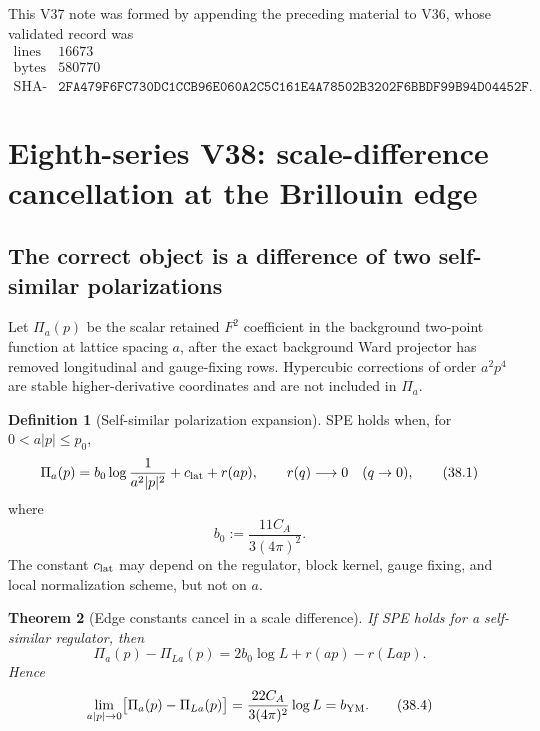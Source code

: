 \documentclass[11pt,oneside]{book}
\newtheorem{theorem}{Theorem}[chapter]
\theoremstyle{definition}
\newtheorem{definition}[theorem]{Definition}
\theoremstyle{remark}
\begin{document}
This V37 note was formed by appending the preceding material to V36,
whose validated record was
\[
\begin{array}{c|c}
\text{lines}&16673\\
\text{bytes}&580770\\
\text{SHA-256}&
\texttt{2FA479F6FC730DC1CCB96E060A2C5C161E4A78502B3202F6BBDF99B94D04452F}.
\end{array}
\]



\section{Eighth-series V38: scale-difference cancellation at the
Brillouin edge}

\subsection{The correct object is a difference of two self-similar
polarizations}

Let \(\Pi_a(p)\) be the scalar retained \(F^2\) coefficient in the
background two-point function at lattice spacing \(a\), after the
exact background Ward projector has removed longitudinal and
gauge-fixing rows.  Hypercubic corrections of order \(a^2p^4\) are
stable higher-derivative coordinates and are not included in
\(\Pi_a\).

\begin{definition}[Self-similar polarization expansion]
\label{def:e8v38-SPE}
SPE holds when, for \(0<a|p|\leq p_0\),
\[
 \Pi_a(p)
 =
 b_0\log\frac1{a^2|p|^2}
 +c_{\rm lat}
 +r(ap),\qquad
 r(q)\longrightarrow0\quad(q\to0),                              \tag{38.1}
\]
where
\[
                         b_0:=\frac{11C_A}{3(4\pi)^2}.           \tag{38.2}
\]
The constant \(c_{\rm lat}\) may depend on the regulator, block
kernel, gauge fixing, and local normalization scheme, but not on
\(a\).
\end{definition}

\begin{theorem}[Edge constants cancel in a scale difference]
\label{thm:e8v38-edge-cancel}
If SPE holds for a self-similar regulator, then
\[
\boxed{\qquad
 \Pi_a(p)-\Pi_{La}(p)
 =
 2b_0\log L+r(ap)-r(Lap).
\qquad}                                                         \tag{38.3}
\]
Hence
\[
 \lim_{a|p|\to0}
 \bigl[\Pi_a(p)-\Pi_{La}(p)\bigr]
 =
 \frac{22C_A}{3(4\pi)^2}\log L=b_{\rm YM}.                       \tag{38.4}
\]
\end{theorem}
\end{document}
